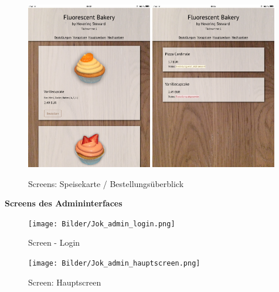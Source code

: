 			\begin{figure}[H]
			\begin{centering}
			\includegraphics[width = 0.49\textwidth]{Bilder/Jok_speisekarte.png}
			\includegraphics[width = 0.49\textwidth]{Bilder/Jok_status.png}
			\par\end{centering}
			\caption{Screens: Speisekarte / Bestellungsüberblick}
			\label{Screens: Speisekarte / Bestellungsüberblick}
			\end{figure}
\textbf{Screens des Admininterfaces}
			\begin{figure}[H]
			\begin{centering}
			\texttt{[image: Bilder/Jok\_admin\_login.png]}
			\par\end{centering}
			\caption{Screen - Login}
			\label{Screen - Login}
			\end{figure}
			\begin{figure}[H]
			\begin{centering}
			\texttt{[image: Bilder/Jok\_admin\_hauptscreen.png]}
			\par\end{centering}
			\caption{Screen: Hauptscreen}
			\label{Screen: Hauptscreen}
			\end{figure}  
